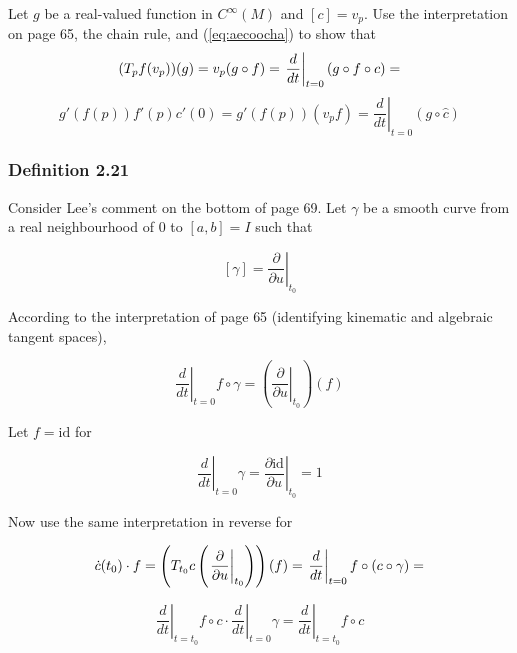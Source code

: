 \documentclass[12pt]{article}
\begin{document}
Let $g$ be a real-valued function in $C^{\infty}(M)$ and $[c]=v_{p}$.
Use the interpretation on page 65, the chain rule, and
(\ref{eq:aecoocha}) to show that
\begin{equation}
  \label{eq:iephavam}
(T_{p}f(v_{p}))(g)=v_{p}(g\circ{}f)=\left.\frac{d}{dt}\right\vert_{t=0}(g\circ{}f\circ{}c)=\notag
\end{equation}
\begin{equation}
  \label{eq:hekeivei}
g'(f(p))f'(p)c'(0)=g'(f(p))(v_{p}f)=\left.\frac{d}{dt}\right\vert_{t=0}(g\circ{}\hat{c})
\end{equation}

\subsubsection{Definition 2.21}
\label{subsubsection:ipaikaph}

Consider Lee's comment on the bottom of page 69. Let $\gamma$ be a smooth
curve from a real neighbourhood of $0$ to $[a,b]=I$ such that 

\begin{equation}
  \label{eq:wohyeisu}
  [\gamma]=\left.\frac{\partial}{\partial{}u}\right\vert_{t_{0}}
\end{equation}

According to the interpretation of page 65 (identifying kinematic and
algebraic tangent spaces),

\begin{equation}
  \label{eq:oengueko}
\left.\frac{d}{dt}\right\vert_{t=0}f\circ\gamma=\left(\left.\frac{\partial}{\partial{}u}\right\vert_{t_{0}}\right)(f)
\end{equation}

Let $f=\mbox{id}$ for

\begin{equation}
  \label{eq:aexoosho}
\left.\frac{d}{dt}\right\vert_{t=0}\gamma=\left.\frac{\partial\mbox{id}}{\partial{}u}\right\vert_{t_{0}}=1
\end{equation}

Now use the same interpretation in reverse for

\begin{equation}
  \label{eq:cebaasee}
  \dot{c}(t_{0})\cdot{}f=\left(T_{t_{0}}c\left(\left.\frac{\partial}{\partial{}u}\right\vert_{t_{0}}\right)\right)(f)=\left.\frac{d}{dt}\right\vert_{t=0}f\circ(c\circ\gamma)=\notag
\end{equation}

\begin{equation}
  \label{eq:cebaasee}
  \left.\frac{d}{dt}\right\vert_{t=t_{0}}f\circ{}c\cdot\left.\frac{d}{dt}\right\vert_{t=0}\gamma=\left.\frac{d}{dt}\right\vert_{t=t_{0}}f\circ{}c
\end{equation}
\end{document}
